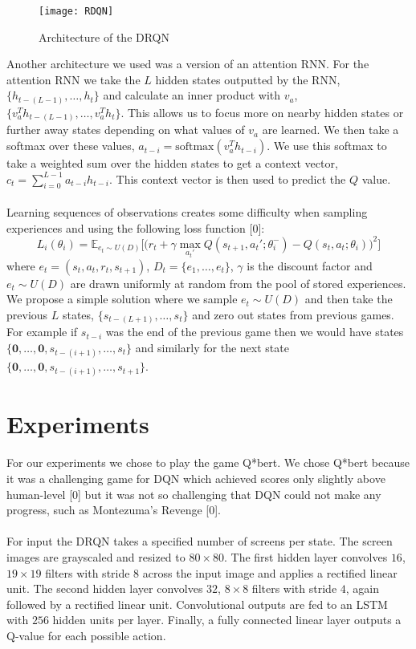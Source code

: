 \documentclass{article}
\begin{document}
\begin{figure}[h]
    \centering
    \texttt{[image: RDQN]}
    \caption{Architecture of the DRQN}
\end{figure}

Another architecture we used was a version of an attention RNN. For the attention
RNN we take the $L$ hidden states outputted by the RNN, $\{h_{t-(L-1)}, \dots, h_{t}\}$
and calculate an inner product with $v_a$, $\{v_a^Th_{t-(L-1)}, \dots, v_a^Th_{t}\}$.
This allows us to focus more on nearby hidden states or further away states depending
on what values of $v_a$ are learned. We then take a softmax over these values,
$a_{t-i} = \text{softmax}(v_a^Th_{t-i})$. We use this softmax to take a weighted
sum over the hidden states to get a context vector, $c_t =
\sum_{i=0}^{L-1}a_{t-i}h_{t-i}$. This context vector is then used to predict the
$Q$ value. \\
\\
Learning sequences of observations creates some difficulty when sampling experiences
and using the following loss function [0]:
$$L_i(\theta_i) = \mathbb{E}_{e_t \sim U(D)}
\Big[\Big(
r_t + \gamma \max_{a_t'}Q(s_{t+1}, a_t'; \theta_i^-) -Q(s_t, a_t; \theta_i)
\Big)^2 \Big]$$
where $e_t = (s_t, a_t, r_t, s_{t+1})$, $D_t = \{e_1, \dots, e_t\}$, $\gamma$
is the discount factor and $e_t \sim U(D)$ are drawn uniformly at random from the
pool of stored experiences. We propose a simple solution where we sample $e_t
\sim U(D)$ and then take the previous $L$ states, $\{s_{t-(L+1)}, \dots, s_t\}$
and zero out states from previous games. For example if $s_{t-i}$ was the end of
the previous game then we would have states $\{\mathbf{0}, \dots, \mathbf{0},
s_{t-(i+1)}, \dots, s_t\}$ and similarly for the next state $\{\mathbf{0}, \dots,
\mathbf{0},s_{t-(i+1)}, \dots, s_{t+1}\}$.


\section{Experiments}
For our experiments we chose to play the game Q*bert. We chose Q*bert because it
was a challenging game for DQN which achieved scores only slightly above human-level
[0] but it was not so challenging that DQN could not make any progress, such as
Montezuma's Revenge [0]. \\
\\
For input the DRQN takes a specified number of screens per state. The screen images
are grayscaled and resized to $80 \times 80$. The first hidden layer convolves $16$,
$19 \times 19$ filters with stride 8 across the input image and applies a rectified
linear unit.  The second hidden layer convolves $32$, $8 \times 8$ filters with
stride $4$, again followed by a rectified linear unit.  Convolutional outputs are
fed to an LSTM with $256$ hidden units per layer.  Finally, a fully connected
linear layer outputs a Q-value for each possible action. \\
\\
\end{document}
